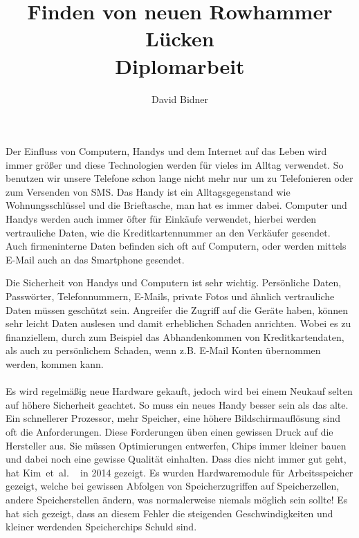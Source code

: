 \documentclass[a4paper]{article}
\title{Finden von neuen Rowhammer Lücken \\ \vspace{+2ex}\small{Diplomarbeit}}
\author{David Bidner}
\date{\vspace{-5ex}}
\newcommand{\etal}{et~al. }
\begin{document}
\maketitle

Der Einfluss von Computern, Handys und dem Internet auf das Leben wird immer
größer und diese Technologien werden für vieles im Alltag verwendet. So benutzen
wir unsere Telefone schon lange nicht mehr nur um zu Telefonieren oder zum
Versenden von SMS. Das Handy ist ein Alltagsgegenstand wie Wohnungsschlüssel und
die Brieftasche, man hat es immer dabei. Computer und Handys werden auch immer
öfter für Einkäufe verwendet, hierbei werden vertrauliche Daten, wie die
Kreditkartennummer an den Verkäufer gesendet. Auch firmeninterne Daten befinden
sich oft auf Computern, oder werden mittels E-Mail auch an das Smartphone
gesendet.

Die Sicherheit von Handys und Computern ist sehr wichtig. Persönliche
Daten, Passwörter, Telefonnummern, E-Mails, private Fotos und ähnlich
vertrauliche Daten müssen geschützt sein. Angreifer die Zugriff auf die
Geräte haben, können sehr leicht Daten auslesen und damit erheblichen
Schaden anrichten. Wobei es zu finanziellem, durch zum Beispiel das
Abhandenkommen von Kreditkartendaten, als auch zu persönlichem Schaden,
wenn z.B. E-Mail Konten übernommen werden, kommen kann.

\paragraph{}

Es wird regelmäßig neue Hardware gekauft, jedoch wird bei einem Neukauf selten
auf höhere Sicherheit geachtet. So muss ein neues Handy besser sein als das
alte. Ein schnellerer Prozessor, mehr Speicher, eine höhere Bildschirmauflösung
sind oft die Anforderungen.
Diese Forderungen üben einen gewissen Druck auf die Hersteller aus. Sie müssen
Optimierungen entwerfen, Chips immer kleiner bauen und dabei noch eine gewisse
Qualität einhalten. Dass dies nicht immer gut geht, hat
Kim~\etal~\cite{rowhammergeneral} in 2014 gezeigt. Es wurden Hardwaremodule für
Arbeitsspeicher gezeigt, welche bei gewissen Abfolgen von Speicherzugriffen auf
Speicherzellen, andere Speicherstellen ändern, was normalerweise niemals möglich
sein sollte! Es hat sich gezeigt, dass an diesem Fehler die steigenden
Geschwindigkeiten und kleiner werdenden Speicherchips Schuld sind.
\end{document}
